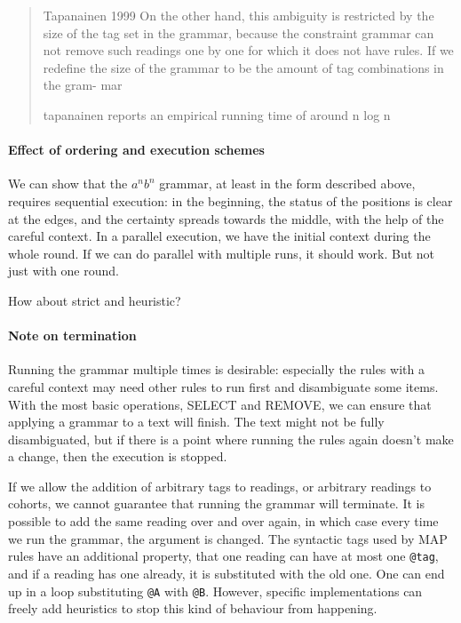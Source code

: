 \begin{quote}
Tapanainen 1999
On the other hand, this ambiguity is restricted by the size of the tag set in the grammar, because the constraint grammar can not remove such readings one by one for which it does not have rules. If we redefine the size of the grammar     to be the amount of tag combinations in the gram- mar

tapanainen reports an empirical running time of around n log n
\end{quote}



\paragraph{Effect of ordering and execution schemes}

We can show that the $a^nb^n$ grammar, at least in the form described above,
requires sequential execution: in the beginning, the status of the positions is 
clear at the edges, and the certainty spreads towards the middle, with the help of
the careful context.
In a parallel execution, we have the initial context during the whole round.
If we can do parallel with multiple runs, it should work. But not just with one round.

How about strict and heuristic?

\paragraph{Note on termination} 
Running the grammar multiple times is desirable: especially the rules
with a careful context may need other rules to run first and
disambiguate some items.
With the most basic operations, SELECT and REMOVE, we can ensure that
applying a grammar to a text will finish. The text might not be fully
disambiguated, but if there is a point where running the rules again
doesn't make a change, then the execution is stopped.

If we allow the addition of arbitrary tags to readings, or arbitrary
readings to cohorts, we cannot guarantee that running the grammar will
terminate. It is possible to add the same reading over and over again,
in which case every time we run the grammar, the argument is changed.
The syntactic tags used by MAP rules have an additional property,
that one reading can have at most one \texttt{@tag}, and if a reading has one
already, it is substituted with the old one. One can end up in a loop
substituting \texttt{@A} with \texttt{@B}.
However, specific implementations can freely add heuristics to stop
this kind of behaviour from happening.



